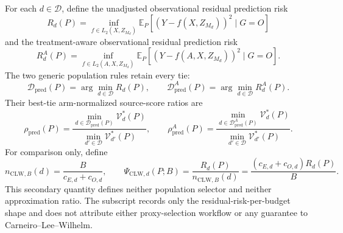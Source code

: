 For each \(d\in\mathcal D\), define the unadjusted observational residual prediction risk
\[
 R_d(P)=\inf_{f\in L_2(X,Z_{M_d})}
 \mathbb E_P[(Y-f(X,Z_{M_d}))^2\mid G=O]
\]
and the treatment-aware observational residual prediction risk
\[
 R_d^A(P)=\inf_{f\in L_2(A,X,Z_{M_d})}
 \mathbb E_P[(Y-f(A,X,Z_{M_d}))^2\mid G=O].
\]
The two generic population rules retain every tie:
\[
 \mathcal D_{\mathrm{pred}}(P)=\arg\min_{d\in\mathcal D}R_d(P),
 \qquad
 \mathcal D_{\mathrm{pred}}^A(P)=\arg\min_{d\in\mathcal D}R_d^A(P).
\]
Their best-tie arm-normalized source-score ratios are
\[
 \rho_{\mathrm{pred}}(P)=
 \frac{\min_{d\in\mathcal D_{\mathrm{pred}}(P)}\mathcal V_d^*(P)}
 {\min_{d'\in\mathcal D}\mathcal V_{d'}^*(P)},
 \qquad
 \rho_{\mathrm{pred}}^A(P)=
 \frac{\min_{d\in\mathcal D_{\mathrm{pred}}^A(P)}\mathcal V_d^*(P)}
 {\min_{d'\in\mathcal D}\mathcal V_{d'}^*(P)}.
\]
For comparison only, define
\[
 n_{\mathrm{CLW},B}(d)=\frac{B}{c_{E,d}+c_{O,d}},
 \qquad
 \Psi_{\mathrm{CLW},d}(P;B)
 =\frac{R_d(P)}{n_{\mathrm{CLW},B}(d)}
 =\frac{(c_{E,d}+c_{O,d})R_d(P)}{B}.
\]
This secondary quantity defines neither population selector and neither approximation ratio.  The subscript records only the residual-risk-per-budget shape and does not attribute either proxy-selection workflow or any guarantee to Carneiro--Lee--Wilhelm.